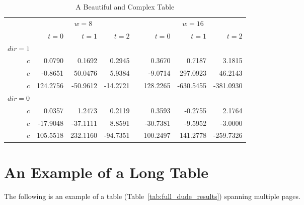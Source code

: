 \begin{table*}\centering
	\begin{tabular}{@{}rrrrcrrr@{}}\toprule
		& \multicolumn{3}{c}{$w = 8$} & \phantom{abc}& \multicolumn{3}{c}{$w = 16$} \\
		\cmidrule{2-4} \cmidrule{6-8} 
		& $t=0$ & $t=1$ & $t=2$ && $t=0$ & $t=1$ & $t=2$\\ \midrule
		$dir=1$\\
		$c$ & 0.0790 & 0.1692 & 0.2945 && 0.3670 & 0.7187 & 3.1815\\
		$c$ & -0.8651& 50.0476& 5.9384&& -9.0714& 297.0923& 46.2143\\
		$c$ & 124.2756& -50.9612& -14.2721&& 128.2265& -630.5455& -381.0930\\
		$dir=0$\\
		$c$ & 0.0357& 1.2473& 0.2119&& 0.3593& -0.2755& 2.1764\\
		$c$ & -17.9048& -37.1111& 8.8591&& -30.7381& -9.5952& -3.0000\\
		$c$ & 105.5518& 232.1160& -94.7351&& 100.2497& 141.2778& -259.7326\\
		\bottomrule
	\end{tabular}
	\caption{A Beautiful and Complex Table}\label{tab:sometable}
\end{table*}

\blindtext

\section{An Example of a Long Table}

The following is an example of a table (Table~\ref{tab:full_dude_results}) spanning multiple pages.

